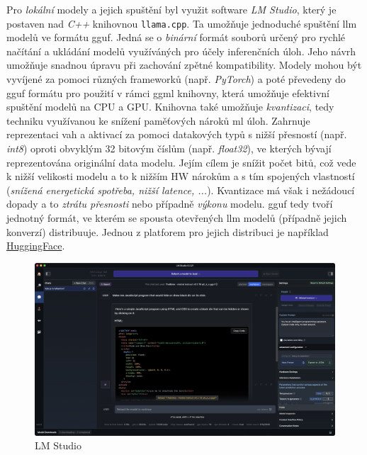 \documentclass[czech, ma, kiv, he, iso690numb, pdf, viewonly]{fasthesis}
\begin{document}
            Pro \emph{lokální} modely a jejich spuštění byl využit software \textit{LM Studio}, který je postaven nad \textit{C++} knihovnou \verb|llama.cpp|. Ta umožňuje jednoduché spuštění \Gls{llm} modelů ve formátu \acrfull{gguf}. Jedná se o \textit{binární} formát souborů určený pro rychlé načítání a ukládání modelů využíváných pro účely inferenčních úloh. Jeho návrh umožňuje snadnou úpravu při zachování zpětné kompatibility. \cite{ggerganov_gguf} \cite{huggingface_gguf} Modely mohou být vyvíjené za pomoci různých frameworků (např. \textit{PyTorch}) a poté převedeny do \acrshort{gguf} formátu pro použití v rámci \acrshort{ggml} knihovny, která umožňuje efektivní spuštění modelů na CPU a GPU. Knihovna také umožňuje \emph{kvantizaci}, tedy techniku využívanou ke snížení paměťových nároků \acrshort{ml} úloh. Zahrnuje reprezentaci vah a aktivací za pomoci datakových typů s nižší přesností (např. \textit{int8}) oproti obvyklým 32 bitovým číslům (např. \textit{float32}), ve kterých bývají reprezentována originální data modelu. Jejím cílem je snížit počet bitů, což vede k nižší velikosti modelu a to k nižším HW nárokům a s tím spojených vlastností (\textit{snížená energetická spotřeba, nižší latence, ...}). Kvantizace má však i nežádoucí dopady a to \textit{ztrátu přesnosti} nebo případně \textit{výkonu} modelu. \cite{huggingface_quantization} \Acrshort{gguf} tedy tvoří jednotný formát, ve kterém se spousta otevřených \Gls{llm} modelů (případně jejich konverzí) distribuuje. Jednou z platforem pro jejich distribuci je například \href{https://huggingface.co}{HuggingFace}.

            \begin{figure}
                \includegraphics[width=\textwidth]{pic/lm_studio.png}
                \centering
                \caption{LM Studio}
                \label{fig:lm_studio}
            \end{figure}
\end{document}
